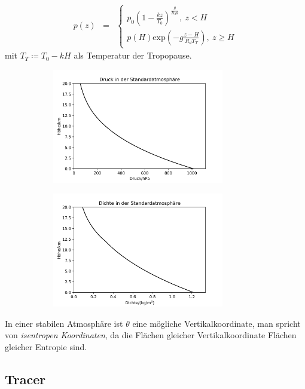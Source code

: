 \documentclass{book}
\renewcommand{\exp}{\text{exp}}
\begin{document}
%
\begin{eqnarray}
p(z) & = & \left\lbrace\begin{array}{c}
p_0\left(1 - \frac{kz}{T_0}\right)^\frac{g}{R_dk}, \:z < H\\
p(H)\exp\left(-g\frac{z - H}{R_dT_T}\right) , \:z\geq H
\end{array}\right.
\end{eqnarray}
%
mit $T_T \coloneqq T_0 - kH$ als Temperatur der Tropopause.

\begin{figure}
\centering
\begin{subfigure}[c]{.49\textwidth}
\centering
\includegraphics[height = 5cm]{figs/standard_atmosphere_pressure.png}
\end{subfigure}
\begin{subfigure}[c]{.49\textwidth}
\centering
\includegraphics[height = 5cm]{figs/standard_atmosphere_density.png}
\end{subfigure}
\end{figure}

In einer stabilen Atmosphäre ist $\theta$ eine mögliche Vertikalkoordinate, man spricht von \textit{isentropen Koordinaten}, da die Flächen gleicher Vertikalkoordinate Flächen gleicher Entropie sind.

\subsection{Tracer}
\label{sec:tracer}
\end{document}
